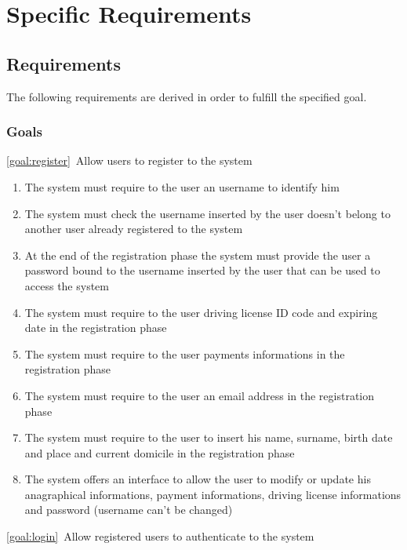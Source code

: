 \section{Specific Requirements}

\subsection{Requirements}
The following requirements are derived in order to fulfill the specified goal.
\subsubsection{Goals}
	\begin{description}
		\item \ref{goal:register}\ Allow users to register to the system
			\begin{enumerate}[label=\textbf{R\arabic*}]
  				\item The system must require to the user an username to identify him
   				\item The system must check the username inserted by the user doesn't belong to
   				another user already registered to the system 
   				\item At the end of the registration phase the system must provide the user a password
   				bound to the username inserted by the user that can be used to access the system
   				\item The system must require to the user driving license ID code and expiring date in the
   				registration phase
   				\item The system must require to the user payments informations in the registration phase
   				\item The system must require to the user an email address in the registration phase
   				\item The system must require to the user to insert his name, surname, birth date and
   				place and current domicile in the registration phase
   				\item The system offers an interface to allow the user to modify or update his
   				anagraphical informations, payment informations, driving license informations and
   				password (username can't be changed)
  			\end{enumerate}
		\item \ref{goal:login}\ Allow registered users to authenticate to the system
			\begin{enumerate}[label=\textbf{R\arabic*}]

\end{enumerate}
\end{description}
